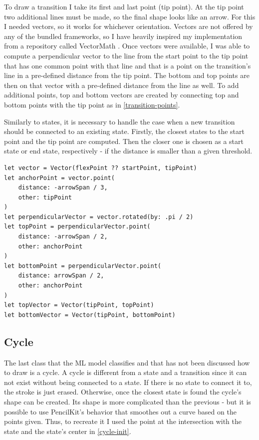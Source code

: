 To draw a transition I take its first and last point (tip point). At the tip point two additional lines must be made, so the final shape looks like an arrow. For this I needed vectors, so it works for whichever orientation. Vectors are not offered by any of the bundled frameworks, so I have heavily inspired my implementation from a repository called VectorMath \cite{vectormath}. Once vectors were available, I was able to compute a perpendicular vector to the line from the start point to the tip point that has one common point with that line and that is a point on the transition's line in a pre-defined distance from the tip point. The bottom and top points are then on that vector with a pre-defined distance from the line as well. To add additional points, top and bottom vectors are created by connecting top and bottom points with the tip point as in \ref{transition-points}.

Similarly to states, it is necessary to handle the case when a new transition should be connected to an existing state. Firstly, the closest states to the start point and the tip point are computed. Then the closer one is chosen as a start state or end state, respectively - if the distance is smaller than a given threshold.

\begin{lstlisting}[caption={Computation of top and bottom points, vectors}, label=transition-points]
let vector = Vector(flexPoint ?? startPoint, tipPoint)
let anchorPoint = vector.point(
    distance: -arrowSpan / 3, 
    other: tipPoint
)
let perpendicularVector = vector.rotated(by: .pi / 2)
let topPoint = perpendicularVector.point(
    distance: -arrowSpan / 2,
    other: anchorPoint
)
let bottomPoint = perpendicularVector.point(
    distance: arrowSpan / 2,
    other: anchorPoint
)
let topVector = Vector(tipPoint, topPoint)
let bottomVector = Vector(tipPoint, bottomPoint)
\end{lstlisting}

\subsection{Cycle}

The last class that the ML model classifies and that has not been discussed how to draw is a cycle. A cycle is different from a state and a transition since it can not exist without being connected to a state. If there is no state to connect it to, the stroke is just erased. Otherwise, once the closest state is found the cycle's shape can be created. Its shape is more complicated than the previous - but it is possible to use PencilKit's behavior that smoothes out a curve based on the points given. Thus, to recreate it I used the point at the intersection with the state and the state's center in \ref{cycle-init}.

